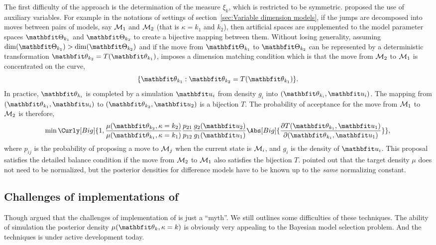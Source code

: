 The first difficulty of the \rjmcmc approach is the determination of the
measure $\xi_k$, which is restricted to be symmetric. \textcite{Green1995}
proposed the use of auxiliary variables. For example in the notations of
settings of section~\ref{sec:Variable dimension models}, if the jumps are
decomposed into moves between pairs of models, say $\mathcal{M}_1$ and $\mathcal{M}_2$
(that is $\kappa = k_1$ and $k_2$), then artificial spaces are supplemented to
the model parameter spaces $\bTh_{k_1}$ and $\bTh_{k_2}$ to create a bijective
mapping between them. Without losing generality, assuming $\dim(\bTh_{k_1}) >
\dim(\bTh_{k_2})$ and if the move from $\bTh_{k_1}$ to $\bTh_{k_2}$ can be
represented by a deterministic transformation $\bth_{k_2}= T(\bth_{k_1})$,
\textcite{Green1995} imposes a dimension matching condition which is that the
move from $\mathcal{M}_2$ to $\mathcal{M}_1$ is concentrated on the curve,
\begin{equation}
  \{\bth_{k_1}:\bth_{k_2}= T(\bth_{k_1})\}.
\end{equation}
In practice, $\bth_{k_i}$ is completed by a simulation $\bfu_i$ from density
$g_i$ into $(\bth_{k_i},\bfu_i)$. The mapping from $(\bth_{k_1},\bfu_i)$ to
$(\bth_{k_2},\bfu_2)$ is a bijection $T$. The probability of acceptance for
the move from $\mathcal{M}_1$ to $\mathcal{M}_2$ is therefore,
\begin{equation}
  \min\Curly[Big]{1,
    \frac{\mu(\bth_{k_2},\kappa = k_2)}{\mu(\bth_{k_1},\kappa = k_1)}
    \frac{p_{21}}{p_{12}} \frac{g_2(\bfu_2)}{g_1(\bfu_1)}
    \Abs[Big]{
      \frac{\partial T(\bth_{k_1},\bfu_1)}{\partial (\bth_{k_1},\bfu_1)}}},
\end{equation}
where $p_{ij}$ is the probability of proposing a move to $\mathcal{M}_j$ when the
current state is $\mathcal{M}_i$, and $g_i$ is the density of $\bfu_i$. This
proposal satisfies the detailed balance condition if the move from $\mathcal{M}_2$
to $\mathcal{M}_1$ also satisfies the bijection $T$. \textcite{Green1995} pointed
out that the target density $\mu$ does not need to be normalized, but the
posterior densities for difference models have to be known up to the
\emph{same} normalizing constant.

\subsection{Challenges of implementations of \protect\rjmcmc}
\label{sub:Challenges of implementations of rjmcmc}

Though \textcite{Green2009} argued that the challenges of implementation of
\rjmcmc is just a ``myth''. We still outlines some difficulties of these
techniques. The ability of simulation the posterior density $\mu(\bth_k,\kappa
= k)$ is obviously very appealing to the Bayesian model selection problem. And
the \rjmcmc techniques is under active development today.

